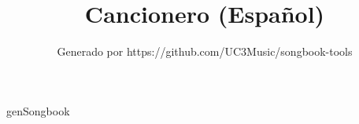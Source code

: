 \documentclass[11pt,a4paper,openany]{book}  %
\begin{document}
\Large

\title{Cancionero (Español)}
\author{Generado por https://github.com/UC3Music/songbook-tools} 

\maketitle
\cleardoublepage
\tableofcontents
\newpage  %


genSongbook

\end{document}
